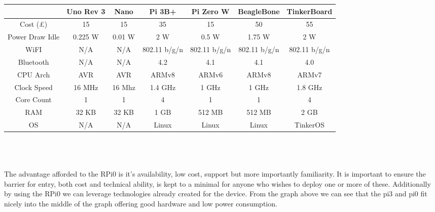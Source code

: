 \hspace{-2cm}
\begin{tabular}{ccccccc}
	\hline 
	{} & Uno Rev 3 & Nano & Pi 3B+ & Pi Zero W & BeagleBone & TinkerBoard \\ 
	\hline 
	Cost (£) & 15 & 15 & 35 & 15 & 50 & 55 \\ 
	Power Draw Idle & 0.225 W & 0.01 W & 2 W & 0.5 W & 1.75 W & 2 W  \\ 
	WiFI & N/A & N/A & 802.11 b/g/n & 802.11 b/g/n & 802.11 b/g/n & 802.11 b/g/n \\ 
	Bluetooth & N/A & N/A & 4.2 & 4.1 & 4.1 & 4.0 \\ 
	CPU Arch & AVR & AVR & ARMv8 & ARMv6 & ARMv8 & ARMv7 \\ 
	Clock Speed & 16 MHz & 16 Mhz & 1.4 GHz & 1 GHz & 1 GHz & 1.8 GHz \\ 
	Core Count & 1 & 1 & 4 & 1 & 1 & 4 \\ 
	RAM & 32 KB & 32 KB & 1 GB & 512 MB & 512 MB & 2 GB \\ 
	OS & N/A & N/A & Linux & Linux & Linux & TinkerOS \\
	\hline 
\end{tabular}
\\\\\\
The advantage afforded to the RPi0 is it’s availability, low cost, support but more importantly familiarity. It is important to ensure the barrier for entry, both cost and technical ability, is kept to a minimal for anyone who wishes to deploy one or more of these. Additionally by using the RPi0 we can leverage technologies already created for the device. 
From the graph above we can see that the pi3 and pi0 fit nicely into the middle of the graph offering good hardware and low power consumption. 